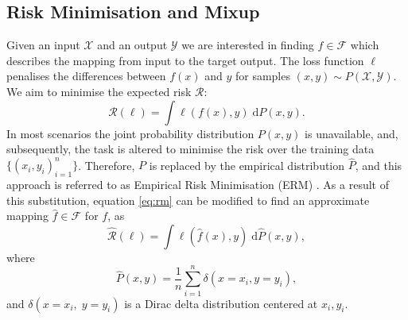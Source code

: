 \subsection{Risk Minimisation and Mixup}
Given an input $\mathcal{X}$ and an output $\mathcal{Y}$ we are interested in finding $f \in \mathcal{F}$ which describes the mapping from input to the target output. The loss function $\ell$ penalises the differences between $f(x)$ and $y$ for samples $(x, y) \sim P(\mathcal{X}, \mathcal{Y})$. We aim to minimise the expected risk $\mathcal{R}$:
\begin{equation}
\mathcal{R}(\ell) = \int \ell(f(x), y)\; \mathrm{d}P(x, y).
\label{eq:rm}
\end{equation}
In most scenarios the joint probability distribution $P(x,y)$ is unavailable, and, subsequently, the task is altered to minimise the risk over the training data $\{(x_i,y_i)_{i=1}^{n}\}$. Therefore, $P$
is replaced by the empirical distribution $\hat{P}$, and this approach is referred to as Empirical Risk Minimisation (ERM) \cite{erm}. As a result of this substitution, equation \eqref{eq:rm} can be modified to find an approximate mapping $\hat{f} \in \mathcal{F}$ for $f$, as
\begin{equation}
\hat{\mathcal{R}}(\ell) = \int \ell(\hat{f}(x), y)\; \mathrm{d}\hat{P}(x, y),
\label{eq:erm}
\end{equation}
where
\begin{equation}
\hat{P}(x, y) = \frac{1}{n} \sum_{i=1}^{n} \delta(x=x_i, y=y_i),
\end{equation}
and $\delta(x=x_i, \;y=y_i)$ is a Dirac delta distribution centered at $x_i, y_i$. 


